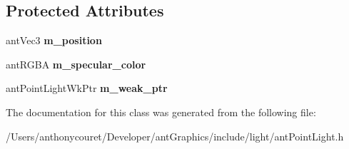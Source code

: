 \subsection*{Protected Attributes}
\begin{DoxyCompactItemize}
\item 
\hypertarget{classant_point_light_adc09bb0f8f8435e2b7075bdde86f5ab6}{ant\+Vec3 {\bfseries m\+\_\+position}}\label{classant_point_light_adc09bb0f8f8435e2b7075bdde86f5ab6}

\item 
\hypertarget{classant_point_light_abdf53de5914cc5f50a0513e071ad7232}{ant\+R\+G\+B\+A {\bfseries m\+\_\+specular\+\_\+color}}\label{classant_point_light_abdf53de5914cc5f50a0513e071ad7232}

\item 
\hypertarget{classant_point_light_a1c001f73c63d0eac6b37829c626dee9a}{ant\+Point\+Light\+Wk\+Ptr {\bfseries m\+\_\+weak\+\_\+ptr}}\label{classant_point_light_a1c001f73c63d0eac6b37829c626dee9a}

\end{DoxyCompactItemize}


The documentation for this class was generated from the following file\+:\begin{DoxyCompactItemize}
\item 
/\+Users/anthonycouret/\+Developer/ant\+Graphics/include/light/ant\+Point\+Light.\+h\end{DoxyCompactItemize}
